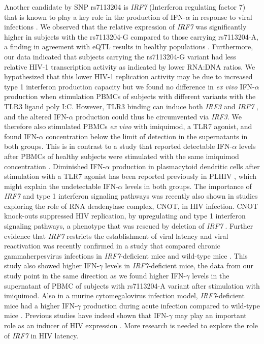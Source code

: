 \documentclass{book}
\begin{document}
\begin{refsection}
Another candidate by SNP rs7113204 is \textit{IRF7} (Interferon regulating factor 7) that is known to play a key role in the production of IFN-$\alpha$ in response to viral infections \cite{Ning2011IRF7}.
We observed that the relative expression of \textit{IRF7} was significantly higher in subjects with the rs7113204-G compared to those carrying rs7113204-A, a finding in agreement with eQTL results in healthy populations \cite{Võsa2018Unraveling}.
Furthermore, our data indicated that subjects carrying the rs7113204-G variant had less relative HIV-1 transcription activity as indicated by lower RNA:DNA ratios.
We hypothesized that this lower HIV-1 replication activity may be due to increased type 1 interferon production capacity but we found no difference in \textit{ex vivo} IFN-$\alpha$ production when stimulation PBMCs of subjects with different variants with the TLR3 ligand poly I:C.
However, TLR3 binding can induce both \textit{IRF3} and \textit{IRF7} \cite{Savitsky2010Regulation}, and the altered IFN-$\alpha$ production could thus be circumvented via \textit{IRF3}.
We therefore also stimulated PBMCs \textit{ex vivo} with imiquimod, a TLR7 agonist, and found IFN-$\alpha$ concentration below the limit of detection in the supernatants in both groups.
This is in contrast to a study that reported detectable IFN-$\alpha$ levels after PBMCs of healthy subjects were stimulated with the same imiquimod concentration \cite{WEEKS1994Induction}.
Diminished IFN-$\alpha$ production in plasmacytoid dendritic cells after stimulation with a TLR7 agonist has been reported previously in PLHIV \cite{Kaushik2013Plasmacytoid,Patamawenu2019Toll}, which might explain the undetectable IFN-$\alpha$ levels in both groups.
The importance of \textit{IRF7} and type 1 interferon signaling pathways was recently also shown in studies exploring the role of RNA deadenylase complex, CNOT, in HIV infection.
CNOT knock-outs suppressed HIV replication, by upregulating and type 1 interferon signaling pathways, a phenotype that was rescued by deletion of \textit{IRF7} \cite{Gordon2020A}.
Further evidence that \textit{IRF7} restricts the establishment of viral latency and viral reactivation was recently confirmed in a study that compared chronic gammaherpesvirus infections in \textit{IRF7}-deficient mice and wild-type mice \cite{Johnson2020Interferon}.
This study also showed higher IFN-$\gamma$ levels in \textit{IRF7}-deficient mice, the data from our study point in the same direction as we found higher IFN-$\gamma$ levels in the supernatant of PBMC of subjects with rs7113204-A variant after stimulation with imiquimod.
Also in a murine cytomegalovirus infection model, \textit{IRF7}-deficient mice had a higher IFN-$\gamma$ production during acute infection compared to wild-type mice \cite{Steinberg2009The}.
Previous studies have indeed shown that IFN-$\gamma$ may play an important role as an inducer of HIV expression \cite{Biswas1992Interferon}.
More research is needed to explore the role of \textit{IRF7} in HIV latency.


\end{refsection}
\end{document}
